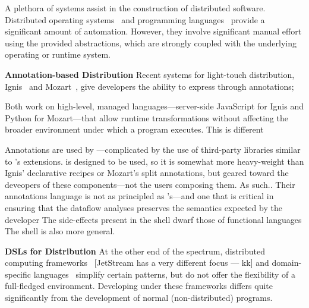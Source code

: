 \documentclass[sigplan,10pt,review,anonymous]{acmart}
\newcommand{\eg}{{\em e.g.}, }
\newcommand{\heading}[1]{\vspace{4pt}\noindent\textbf{#1}\enspace}
\newcommand{\TODO}[1]{\hl{\textbf{TODO:} #1}\xspace}
\newcommand{\kk}[1]{[{\color{magenta}#1 --- kk}]}
\begin{document}
A plethora of systems assist in the construction of distributed software.
Distributed operating systems~\cite{rashid1981accent, walker1983locus, ousterhout1988sprite, mullender1990amoeba, pike1990plan9, rozier1991overview, dorward1997inferno, barak1998mosix, schwarzkopf2013dios, sacha2013osprey} and programming languages~\cite{erlang:96, acute:05, mace:07, cloudhaskell:11}
provide a significant amount of automation. %
However, they involve significant manual effort using the provided abstractions, which are strongly coupled with the underlying operating or runtime system.

\heading{Annotation-based Distribution}
Recent systems for light-touch distribution, Ignis~\cite{ignis:19} and Mozart~\cite{mozart:19}, give developers the ability to express through annotations;

Both work on high-level, managed languages---server-side JavaScript for Ignis and Python for Mozart---that allow runtime transformations without affecting the broader environment under which a program executes.
This is different 

Annotations are used by ---complicated by the use of third-party libraries similar to \sys's extensions.
\sys is designed to be used, so it is somewhat more heavy-weight than Ignis' declarative recipes or Mozart's split annotations, but geared toward the deveopers of these components---not the users composing them.
As such..
Their annotations language is not as principled as \sys's---and one that is critical in ensuring that the dataflow analyses preserves the semantics expected by the developer
The side-effects present in the shell dwarf those of functional languages
The shell is also more general.

\heading{DSLs for Distribution}
At the other end of the spectrum, distributed computing frameworks~\cite{mapreduce:08, ciel:11, spark:12, naiad:13, jetstream:14} \kk{JetStream has a very different focus} and domain-specific languages~\cite{alvaro2011consistency, distal:13, meiklejohn2015lasp, psync:16, dartagnan:18}
simplify certain patterns, 
but do not offer the flexibility of a full-fledged environment.
Developing under these frameworks differs quite significantly from the development of normal (non-distributed) programs.
\end{document}
